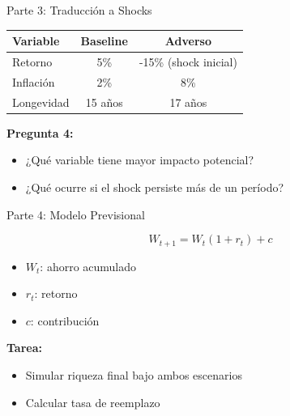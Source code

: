 \documentclass{beamer}
\begin{document}
\begin{frame}{Parte 3: Traducción a Shocks}

\begin{center}
\begin{tabular}{lcc}
\hline
Variable & Baseline & Adverso \\
\hline
Retorno & 5\% & -15\% (shock inicial) \\
Inflación & 2\% & 8\% \\
Longevidad & 15 años & 17 años \\
\hline
\end{tabular}
\end{center}

\vspace{0.4cm}

\textbf{Pregunta 4:}
\begin{itemize}
\item ¿Qué variable tiene mayor impacto potencial?
\item ¿Qué ocurre si el shock persiste más de un período?
\end{itemize}

\end{frame}

\begin{frame}{Parte 4: Modelo Previsional}

\[
W_{t+1} = W_t (1 + r_t) + c
\]

\vspace{0.3cm}

\begin{itemize}
\item $W_t$: ahorro acumulado
\item $r_t$: retorno
\item $c$: contribución
\end{itemize}

\vspace{0.4cm}

\textbf{Tarea:}
\begin{itemize}
\item Simular riqueza final bajo ambos escenarios
\item Calcular tasa de reemplazo
\end{itemize}

\end{frame}
\end{document}
